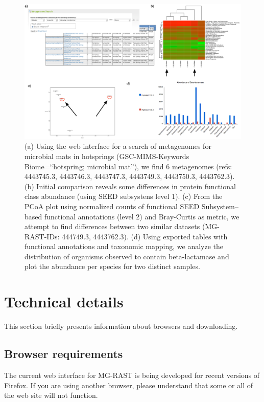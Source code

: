 \documentclass[12pt,fullpage]{report}
\begin{document}
\begin{figure}
\begin{center}
\includegraphics[width=6in]{Images/quad-chart-analysis-example.png}
\end{center}
\caption{
(a) Using the web interface for a search of metagenomes for microbial mats in hotsprings (GSC-MIMS-Keywords Biome=``hotspring; microbial mat''), we find 6 metagenomes (refs: 4443745.3, 4443746.3, 4443747.3, 4443749.3, 4443750.3, 4443762.3). (b) Initial comparison reveals some differences in protein functional class abundance (using \gls{SEED} subsystens level 1). (c) From the PCoA plot using normalized counts of functional \gls{SEED} \gls{Subsystem}--based functional annotations (level 2) and Bray-Curtis as metric, we attempt to find differences between two similar datasets (MG-RAST-IDs: 444749.3, 4443762.3). (d) Using exported tables with functional annotations and taxonomic mapping, we analyze the distribution of organisms observed to contain beta-lactamase and plot the abundance per species for two distinct samples.
}
\label{fig:quad-chart-analysis-example}
\end{figure}
\section{Technical details}
This section briefly presents information about browsers and downloading. 
\subsection{Browser requirements}
The current web interface for MG-RAST is being developed for recent versions of Firefox.
If you are using another browser, please understand that some or all of the web site will not function.
\end{document}
